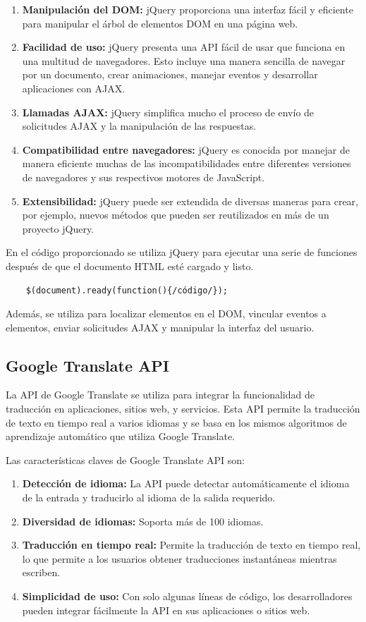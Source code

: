 \documentclass[a4paper, 12pt]{book}
\begin{document}
\begin{enumerate}
  \item \textbf{Manipulación del DOM:} jQuery proporciona una interfaz fácil y eficiente para manipular el árbol de elementos DOM en una página web.
  \item \textbf{Facilidad de uso:} jQuery presenta una API fácil de usar que funciona en una multitud de navegadores. Esto incluye una manera sencilla de navegar por un documento, crear animaciones, manejar eventos y desarrollar aplicaciones con AJAX.
  \item \textbf{Llamadas AJAX:} jQuery simplifica mucho el proceso de envío de solicitudes AJAX y la manipulación de las respuestas.
  \item \textbf{Compatibilidad entre navegadores:} jQuery es conocida por manejar de manera eficiente muchas de las incompatibilidades entre diferentes versiones de navegadores y sus respectivos motores de JavaScript.
  \item \textbf{Extensibilidad:} jQuery puede ser extendida de diversas maneras para crear, por ejemplo, nuevos métodos que pueden ser reutilizados en más de un proyecto jQuery.
\end{enumerate}

En el código proporcionado se utiliza jQuery para ejecutar una serie de funciones después de que el documento HTML esté cargado y listo. 

\begin{verbatim} 
    $(document).ready(function(){/código/});
\end{verbatim}

Además, se utiliza para localizar elementos en el DOM, vincular eventos a elementos, enviar solicitudes AJAX y manipular la interfaz del usuario.

\subsection{Google Translate API}
\label{subsec:google_translate_api}
La API de Google Translate se utiliza para integrar la funcionalidad de traducción en aplicaciones, sitios web, y servicios. Esta API permite la traducción de texto en tiempo 
real a varios idiomas y se basa en los mismos algoritmos de aprendizaje automático que utiliza Google Translate. 

Las características claves de Google Translate API son:

\begin{enumerate}
  \item \textbf{Detección de idioma:} La API puede detectar automáticamente el idioma de la entrada y traducirlo al idioma de la salida requerido.
  \item \textbf{Diversidad de idiomas:} Soporta más de 100 idiomas.
  \item \textbf{Traducción en tiempo real:} Permite la traducción de texto en tiempo real, lo que permite a los usuarios obtener traducciones instantáneas mientras escriben.
  \item \textbf{Simplicidad de uso:} Con solo algunas líneas de código, los desarrolladores pueden integrar fácilmente la API en sus aplicaciones o sitios web.
\end{enumerate}
\end{document}
